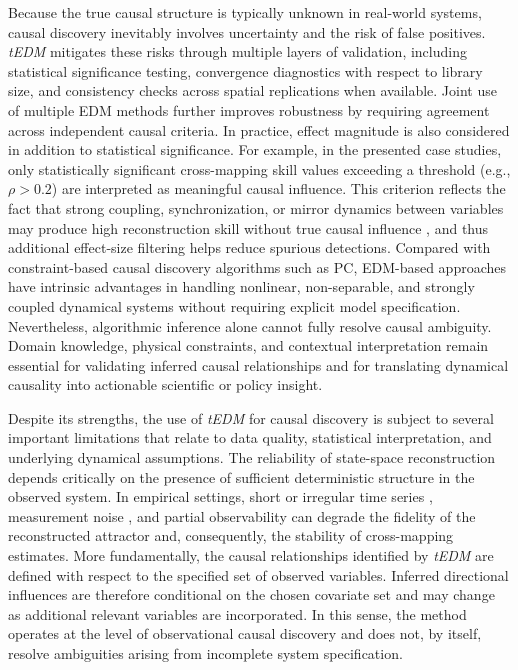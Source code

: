 \documentclass[authoryear,preprint,review,12pt]{elsarticle}
\begin{document}
Because the true causal structure is typically unknown in real-world systems, causal discovery inevitably involves uncertainty and the risk of false positives. \textit{tEDM} mitigates these risks through multiple layers of validation, including statistical significance testing, convergence diagnostics with respect to library size, and consistency checks across spatial replications when available. Joint use of multiple EDM methods further improves robustness by requiring agreement across independent causal criteria. In practice, effect magnitude is also considered in addition to statistical significance. For example, in the presented case studies, only statistically significant cross-mapping skill values exceeding a threshold (e.g., $\rho > 0.2$) are interpreted as meaningful causal influence. This criterion reflects the fact that strong coupling, synchronization, or mirror dynamics between variables may produce high reconstruction skill without true causal influence \citep{mur2013mirroring_effect,gao2023gccm}, and thus additional effect-size filtering helps reduce spurious detections. Compared with constraint-based causal discovery algorithms such as PC, EDM-based approaches have intrinsic advantages in handling nonlinear, non-separable, and strongly coupled dynamical systems without requiring explicit model specification. Nevertheless, algorithmic inference alone cannot fully resolve causal ambiguity. Domain knowledge, physical constraints, and contextual interpretation remain essential for validating inferred causal relationships and for translating dynamical causality into actionable scientific or policy insight.

Despite its strengths, the use of \textit{tEDM} for causal discovery is subject to several important limitations that relate to data quality, statistical interpretation, and underlying dynamical assumptions. The reliability of state-space reconstruction depends critically on the presence of sufficient deterministic structure in the observed system. In empirical settings, short or irregular time series \citep{ma2014cms,clark2015multispatialccm}, measurement noise \citep{mnster2017ccm_performance}, and partial observability can degrade the fidelity of the reconstructed attractor and, consequently, the stability of cross-mapping estimates. More fundamentally, the causal relationships identified by \textit{tEDM} are defined with respect to the specified set of observed variables. Inferred directional influences are therefore conditional on the chosen covariate set and may change as additional relevant variables are incorporated. In this sense, the method operates at the level of observational causal discovery and does not, by itself, resolve ambiguities arising from incomplete system specification.
\end{document}
